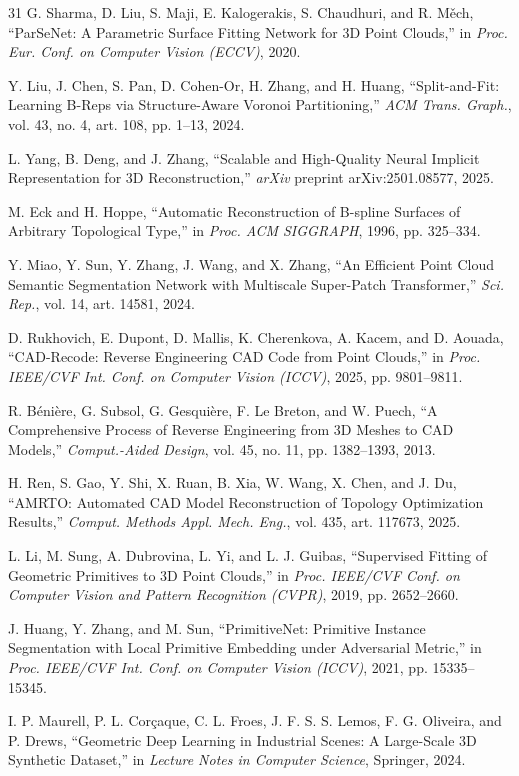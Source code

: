 \documentclass{ieeeaccess}
\begin{document}
\begin{thebibliography}{31}
G. Sharma, D. Liu, S. Maji, E. Kalogerakis, S. Chaudhuri, and R. M\v{e}ch,
``ParSeNet: A Parametric Surface Fitting Network for 3D Point Clouds,''
in \emph{Proc. Eur. Conf. on Computer Vision (ECCV)}, 2020.

Y. Liu, J. Chen, S. Pan, D. Cohen-Or, H. Zhang, and H. Huang,
``Split-and-Fit: Learning B-Reps via Structure-Aware Voronoi Partitioning,''
\emph{ACM Trans. Graph.}, vol. 43, no. 4, art. 108, pp. 1--13, 2024.

L. Yang, B. Deng, and J. Zhang,
``Scalable and High-Quality Neural Implicit Representation for 3D Reconstruction,''
\emph{arXiv} preprint arXiv:2501.08577, 2025.

M. Eck and H. Hoppe,
``Automatic Reconstruction of B-spline Surfaces of Arbitrary Topological Type,''
in \emph{Proc. ACM SIGGRAPH}, 1996, pp. 325--334.

Y. Miao, Y. Sun, Y. Zhang, J. Wang, and X. Zhang,
``An Efficient Point Cloud Semantic Segmentation Network with Multiscale Super-Patch Transformer,''
\emph{Sci. Rep.}, vol. 14, art. 14581, 2024.

D. Rukhovich, E. Dupont, D. Mallis, K. Cherenkova, A. Kacem, and D. Aouada,
``CAD-Recode: Reverse Engineering CAD Code from Point Clouds,''
in \emph{Proc. IEEE/CVF Int. Conf. on Computer Vision (ICCV)}, 2025, pp. 9801--9811.

R. B\'eni\`ere, G. Subsol, G. Gesqui\`ere, F. Le Breton, and W. Puech,
``A Comprehensive Process of Reverse Engineering from 3D Meshes to CAD Models,''
\emph{Comput.-Aided Design}, vol. 45, no. 11, pp. 1382--1393, 2013.

H. Ren, S. Gao, Y. Shi, X. Ruan, B. Xia, W. Wang, X. Chen, and J. Du,
``AMRTO: Automated CAD Model Reconstruction of Topology Optimization Results,''
\emph{Comput. Methods Appl. Mech. Eng.}, vol. 435, art. 117673, 2025.

L. Li, M. Sung, A. Dubrovina, L. Yi, and L. J. Guibas,
``Supervised Fitting of Geometric Primitives to 3D Point Clouds,''
in \emph{Proc. IEEE/CVF Conf. on Computer Vision and Pattern Recognition (CVPR)}, 2019, pp. 2652--2660.

J. Huang, Y. Zhang, and M. Sun,
``PrimitiveNet: Primitive Instance Segmentation with Local Primitive Embedding under Adversarial Metric,''
in \emph{Proc. IEEE/CVF Int. Conf. on Computer Vision (ICCV)}, 2021, pp. 15335--15345.

I. P. Maurell, P. L. Cor\c{c}aque, C. L. Froes, J. F. S. S. Lemos, F. G. Oliveira, and P. Drews,
``Geometric Deep Learning in Industrial Scenes: A Large-Scale 3D Synthetic Dataset,''
in \emph{Lecture Notes in Computer Science}, Springer, 2024.

\end{thebibliography}
\end{document}
